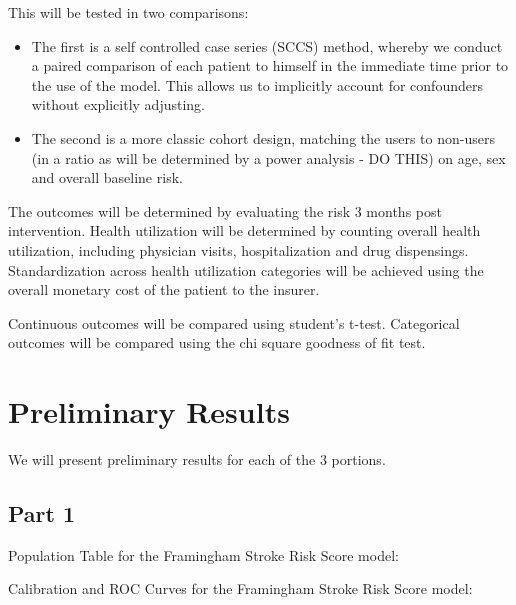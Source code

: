 \documentclass[a4paper,12pt]{article}
\begin{document}
\begin{description}
		This will be tested in two comparisons:
		\begin{itemize}
			\item The first is a self controlled case series (SCCS) method, whereby we conduct a paired comparison of each patient to himself in the immediate time prior to the use of the model. This allows us to implicitly account for confounders without explicitly adjusting.
			
			\item The second is a more classic cohort design, matching the users to non-users (in a ratio as will be determined by a power analysis - DO THIS) on age, sex and overall baseline risk.
		\end{itemize}
	
		The outcomes will be determined by evaluating the risk 3 months post intervention. Health utilization will be determined by counting overall health utilization, including physician visits, hospitalization and drug dispensings. Standardization across health utilization categories will be achieved using the overall monetary cost of the patient to the insurer.
		
		Continuous outcomes will be compared using student's t-test. Categorical outcomes will be compared using the chi square goodness of fit test.
		
	\end{description}
	
	\section{Preliminary Results}
	We will present preliminary results for each of the 3 portions.

	\subsection{Part 1}

	Population Table for the Framingham Stroke Risk Score\cite{DAgostino1994} model:

	
	Calibration and ROC Curves for the Framingham Stroke Risk Score model:
	
\end{document}
